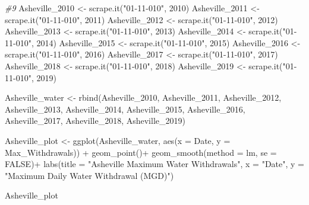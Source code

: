 \documentclass[
]{article}
\newenvironment{Shaded}{\begin{snugshade}}{\end{snugshade}}
\newcommand{\AttributeTok}[1]{\textcolor[rgb]{0.77,0.63,0.00}{#1}}
\newcommand{\CommentTok}[1]{\textcolor[rgb]{0.56,0.35,0.01}{\textit{#1}}}
\newcommand{\ConstantTok}[1]{\textcolor[rgb]{0.00,0.00,0.00}{#1}}
\newcommand{\DecValTok}[1]{\textcolor[rgb]{0.00,0.00,0.81}{#1}}
\newcommand{\FunctionTok}[1]{\textcolor[rgb]{0.00,0.00,0.00}{#1}}
\newcommand{\NormalTok}[1]{#1}
\newcommand{\OtherTok}[1]{\textcolor[rgb]{0.56,0.35,0.01}{#1}}
\newcommand{\SpecialCharTok}[1]{\textcolor[rgb]{0.00,0.00,0.00}{#1}}
\newcommand{\StringTok}[1]{\textcolor[rgb]{0.31,0.60,0.02}{#1}}
\begin{document}
\begin{Shaded}
\begin{Highlighting}[]
\CommentTok{\#9}
\NormalTok{Asheville\_2010 }\OtherTok{\textless{}{-}} \FunctionTok{scrape.it}\NormalTok{(}\StringTok{"01{-}11{-}010"}\NormalTok{, }\DecValTok{2010}\NormalTok{)}
\NormalTok{Asheville\_2011 }\OtherTok{\textless{}{-}} \FunctionTok{scrape.it}\NormalTok{(}\StringTok{"01{-}11{-}010"}\NormalTok{, }\DecValTok{2011}\NormalTok{)}
\NormalTok{Asheville\_2012 }\OtherTok{\textless{}{-}} \FunctionTok{scrape.it}\NormalTok{(}\StringTok{"01{-}11{-}010"}\NormalTok{, }\DecValTok{2012}\NormalTok{)}
\NormalTok{Asheville\_2013 }\OtherTok{\textless{}{-}} \FunctionTok{scrape.it}\NormalTok{(}\StringTok{"01{-}11{-}010"}\NormalTok{, }\DecValTok{2013}\NormalTok{)}
\NormalTok{Asheville\_2014 }\OtherTok{\textless{}{-}} \FunctionTok{scrape.it}\NormalTok{(}\StringTok{"01{-}11{-}010"}\NormalTok{, }\DecValTok{2014}\NormalTok{)}
\NormalTok{Asheville\_2015 }\OtherTok{\textless{}{-}} \FunctionTok{scrape.it}\NormalTok{(}\StringTok{"01{-}11{-}010"}\NormalTok{, }\DecValTok{2015}\NormalTok{)}
\NormalTok{Asheville\_2016 }\OtherTok{\textless{}{-}} \FunctionTok{scrape.it}\NormalTok{(}\StringTok{"01{-}11{-}010"}\NormalTok{, }\DecValTok{2016}\NormalTok{)}
\NormalTok{Asheville\_2017 }\OtherTok{\textless{}{-}} \FunctionTok{scrape.it}\NormalTok{(}\StringTok{"01{-}11{-}010"}\NormalTok{, }\DecValTok{2017}\NormalTok{)}
\NormalTok{Asheville\_2018 }\OtherTok{\textless{}{-}} \FunctionTok{scrape.it}\NormalTok{(}\StringTok{"01{-}11{-}010"}\NormalTok{, }\DecValTok{2018}\NormalTok{)}
\NormalTok{Asheville\_2019 }\OtherTok{\textless{}{-}} \FunctionTok{scrape.it}\NormalTok{(}\StringTok{"01{-}11{-}010"}\NormalTok{, }\DecValTok{2019}\NormalTok{)}

\NormalTok{Asheville\_water }\OtherTok{\textless{}{-}} \FunctionTok{rbind}\NormalTok{(Asheville\_2010, Asheville\_2011, Asheville\_2012, Asheville\_2013, Asheville\_2014, Asheville\_2015, Asheville\_2016, Asheville\_2017, Asheville\_2018, Asheville\_2019)}

\NormalTok{Asheville\_plot }\OtherTok{\textless{}{-}} \FunctionTok{ggplot}\NormalTok{(Asheville\_water, }\FunctionTok{aes}\NormalTok{(}\AttributeTok{x =}\NormalTok{ Date, }\AttributeTok{y =}\NormalTok{ Max\_Withdrawals)) }\SpecialCharTok{+}
  \FunctionTok{geom\_point}\NormalTok{()}\SpecialCharTok{+}
  \FunctionTok{geom\_smooth}\NormalTok{(}\AttributeTok{method =}\NormalTok{ lm, }\AttributeTok{se =} \ConstantTok{FALSE}\NormalTok{)}\SpecialCharTok{+}
  \FunctionTok{labs}\NormalTok{(}\AttributeTok{title =} \StringTok{"Asheville Maximum Water Withdrawals"}\NormalTok{, }\AttributeTok{x =} \StringTok{"Date"}\NormalTok{, }\AttributeTok{y =} \StringTok{"Maximum Daily Water Withdrawal (MGD)"}\NormalTok{)}

\NormalTok{Asheville\_plot}
\end{Highlighting}
\end{Shaded}
\end{document}
